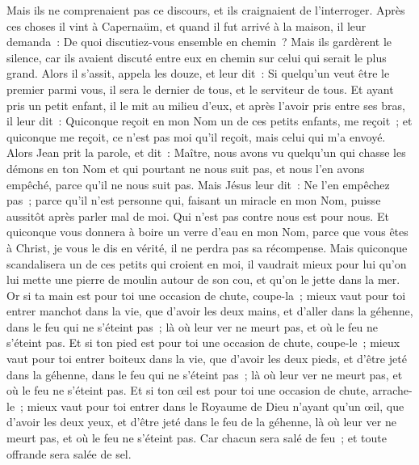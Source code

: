 \begin{multicols}{2}
Mais ils ne comprenaient pas ce discours, et ils craignaient de l'interroger.
Après ces choses il vint à Capernaüm, et quand il fut arrivé à la maison, il leur demanda~: De quoi discutiez-vous ensemble en chemin~?
Mais ils gardèrent le silence, car ils avaient discuté entre eux en chemin sur celui qui serait le plus grand.
Alors il s'assit, appela les douze, et leur dit~: Si quelqu'un veut être le premier parmi vous, il sera le dernier de tous, et le serviteur de tous.
Et ayant pris un petit enfant, il le mit au milieu d'eux, et après l'avoir pris entre ses bras, il leur dit~:
Quiconque reçoit en mon Nom un de ces petits enfants, me reçoit~; et quiconque me reçoit, ce n'est pas moi qu'il reçoit, mais celui qui m'a envoyé.
Alors Jean prit la parole, et dit~: Maître, nous avons vu quelqu'un qui chasse les démons en ton Nom et qui pourtant ne nous suit pas, et nous l'en avons empêché, parce qu'il ne nous suit pas.
Mais Jésus leur dit~: Ne l'en empêchez pas~; parce qu'il n'est personne qui, faisant un miracle en mon Nom, puisse aussitôt après parler mal de moi.
Qui n'est pas contre nous est pour nous.
Et quiconque vous donnera à boire un verre d'eau en mon Nom, parce que vous êtes à Christ, je vous le dis en vérité, il ne perdra pas sa récompense.
Mais quiconque scandalisera un de ces petits qui croient en moi, il vaudrait mieux pour lui qu'on lui mette une pierre de moulin autour de son cou, et qu'on le jette dans la mer.
Or si ta main est pour toi une occasion de chute, coupe-la~; mieux vaut pour toi entrer manchot dans la vie, que d'avoir les deux mains, et d'aller dans la géhenne, dans le feu qui ne s'éteint pas~;
là où leur ver ne meurt pas, et où le feu ne s'éteint pas.
Et si ton pied est pour toi une occasion de chute, coupe-le~; mieux vaut pour toi entrer boiteux dans la vie, que d'avoir les deux pieds, et d'être jeté dans la géhenne, dans le feu qui ne s'éteint pas~;
là où leur ver ne meurt pas, et où le feu ne s'éteint pas.
Et si ton œil est pour toi une occasion de chute, arrache-le~; mieux vaut pour toi entrer dans le Royaume de Dieu n'ayant qu'un œil, que d'avoir les deux yeux, et d'être jeté dans le feu de la géhenne,
là où leur ver ne meurt pas, et où le feu ne s'éteint pas.
Car chacun sera salé de feu~; et toute offrande sera salée de sel.

\end{multicols}
